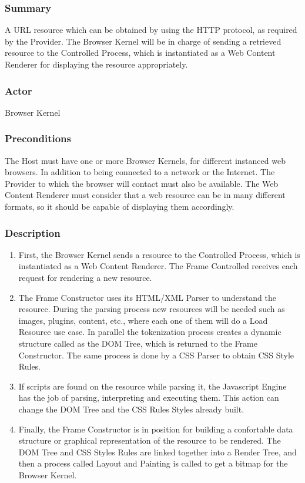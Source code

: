\documentclass[prodmode,acmtecs]{acmsmall}
\begin{document}
\begin{shaded}
    \subsubsection*{Summary} A URL resource which can be obtained by using the HTTP protocol, as required by the Provider. The Browser Kernel will be in charge of sending a retrieved resource to the Controlled Process, which is instantiated as a Web Content Renderer for displaying the resource appropriately.
    \subsubsection*{Actor} Browser Kernel
    \subsubsection*{Preconditions} The Host must have one or more Browser Kernels, for different instanced web browsers. In addition to being connected to a network or the Internet. The Provider to which the browser will contact must also be available. The Web Content Renderer must consider that a web resource can be in many different formats, so it should be capable of displaying them accordingly.

    \subsubsection*{Description}
      \begin{enumerate}\leftskip2.5em
        \item First, the Browser Kernel sends a resource to the Controlled Process, which is instantiated as a Web Content Renderer. The Frame Controlled receives each request for rendering a new resource.
        \item The Frame Constructor uses its HTML/XML Parser to understand the resource. During the parsing process new resources will be needed such as images, plugins, content, etc., where each one of them will do a Load Resource use case. In parallel the tokenization process creates a dynamic structure called as the DOM Tree, which is returned to the Frame Constructor. The same process is done by a CSS Parser to obtain CSS Style Rules.
        \item If scripts are found on the resource while parsing it, the Javascript Engine has the job of parsing, interpreting and executing them. This action can change the DOM Tree and the CSS Rules Styles already built.
        \item Finally, the Frame Constructor is in position for building a confortable data structure or graphical representation of the resource to be rendered. The DOM Tree and CSS Styles Rules are linked together into a Render Tree, and then a process called Layout and Painting is called to get a bitmap \cite{gpuchrome,gecko2} for the Browser Kernel.
      \end{enumerate}


\end{shaded}
\end{document}
